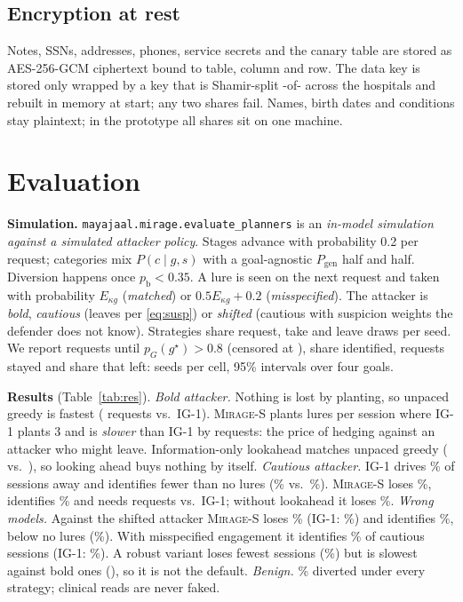 \documentclass[conference,10pt]{IEEEtran}
\newcommand{\Mirage}{\textsc{Mirage}\xspace}
\newcommand{\code}[1]{\texttt{\small #1}}
\newcommand{\pb}{p_{\mathrm{b}}}
\begin{document}
\subsection{Encryption at rest}
Notes, SSNs, addresses, phones, service secrets and the canary table are stored as AES-256-GCM
ciphertext bound to table, column and row. The data key is stored only wrapped by a key that is
Shamir-split \EREncThreshold-of-\EREncTotal{} across the hospitals and rebuilt in memory at start;
any two shares fail. Names, birth dates and conditions stay plaintext; in the prototype all shares
sit on one machine.

\section{Evaluation}
\textbf{Simulation.} \code{mayajaal.mirage.evaluate\_planners} is an \emph{in-model simulation
against a simulated attacker policy}. Stages advance with probability 0.2 per request; categories
mix $P(c\mid g,s)$ with a goal-agnostic $P_\text{gen}$ half and half. Diversion happens once
$\pb<0.35$. A lure is seen on the next request and taken with probability $E_{\kappa g}$
(\emph{matched}) or $0.5E_{\kappa g}+0.2$ (\emph{misspecified}). The attacker is \emph{bold},
\emph{cautious} (leaves per \eqref{eq:susp}) or \emph{shifted} (cautious with suspicion weights the
defender does not know). Strategies share request, take and leave draws per seed. We report
requests until $p_G(g^\star)>0.8$ (censored at \MaxSteps), share identified, requests stayed and
share that left: \NSeeds{} seeds per cell, 95\% intervals over four goals.

\textbf{Results} (Table~\ref{tab:res}). \emph{Bold attacker.} Nothing is lost by planting, so
unpaced greedy is fastest (\DMBoldIgFastSteps{} requests vs.\ IG-1). \Mirage-S plants
\RMBoldStealthLures{} lures per session where IG-1 plants 3 and is \emph{slower} than IG-1 by
\DMBoldStealthSteps{} requests: the price of hedging against an attacker who might leave.
Information-only lookahead matches unpaced greedy (\RMBoldLookSteps{} vs.\ \RMBoldIgFastSteps), so
looking ahead buys nothing by itself.
\emph{Cautious attacker.} IG-1 drives \RMCautIgOneLeft\% of sessions away and identifies fewer than
no lures (\RMCautIgOneIdent\% vs.\ \RMCautNoneIdent\%). \Mirage-S loses \RMCautStealthLeft\%,
identifies \RMCautStealthIdent\% and needs \DMCautStealthSteps{} requests vs.\ IG-1; without lookahead it loses
\RMCautStealthOneLeft\%.
\emph{Wrong models.} Against the shifted attacker \Mirage-S loses \RMShiftStealthLeft\% (IG-1:
\RMShiftIgOneLeft\%) and identifies \RMShiftStealthIdent\%, below no lures (\RMShiftNoneIdent\%).
With misspecified engagement it identifies \RXCautStealthIdent\% of cautious sessions (IG-1:
\RXCautIgOneIdent\%). A robust variant loses fewest sessions (\RMCautRobustLeft\%) but is slowest
against bold ones (\DMBoldRobustSteps), so it is not the default.
\emph{Benign.} \RMBenignDiv\% diverted under every strategy; clinical reads are never faked.
\end{document}

